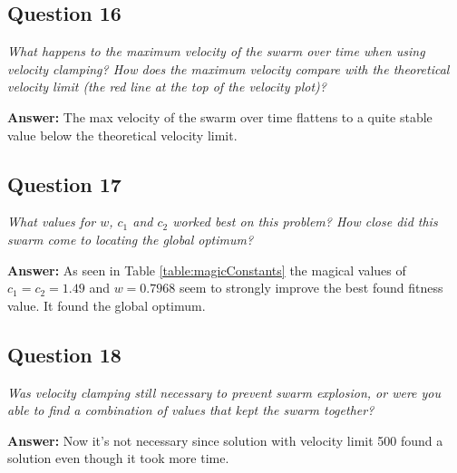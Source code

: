\documentclass[a4paper]{article}
\begin{document}
\subsection*{Question 16}
\emph{What happens to the maximum velocity of the swarm over time
when using velocity clamping? How does the maximum velocity compare with
the theoretical velocity limit (the red line at the top of the velocity plot)?} 

\textbf{Answer:} The max velocity of the swarm over time flattens to a quite stable value below the theoretical velocity limit. 

\begin{table}[h]
\caption{Testing different magical constants}
\label{table:magicConstants}
\end{table}

\subsection*{Question 17}
\emph{What values for $w$, $c_1$ and $c_2$ worked best on this problem? How close did this swarm come to locating the global optimum?} 

\textbf{Answer:} As seen in Table \ref{table:magicConstants} the magical values of $c_1 = c_2 = 1.49$ and $w = 0.7968$ seem to strongly improve the best found fitness value. It found the global optimum. 

\subsection*{Question 18}
\emph{Was velocity clamping still necessary to prevent swarm explosion, or were you able to find a combination of values that kept the swarm together?} 

\textbf{Answer:} Now it's not necessary since solution with velocity limit 500 found a solution even though it took more time.
\end{document}
